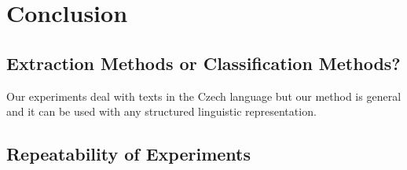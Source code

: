\chapter{Conclusion}

\section{Extraction Methods or Classification Methods?}


Our experiments deal with texts in the Czech language but our method is general and it can be used with any structured linguistic representation. 

\section{Repeatability of Experiments}


